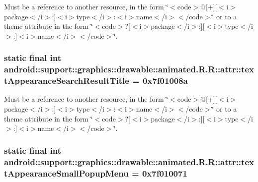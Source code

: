 Must be a reference to another resource, in the form \char`\"{}$<$code$>$@\mbox{[}+\mbox{]}\mbox{[}$<$i$>$package$<$/i$>$:\mbox{]}$<$i$>$type$<$/i$>$:$<$i$>$name$<$/i$>$$<$/code$>$\char`\"{} or to a theme attribute in the form \char`\"{}$<$code$>$?\mbox{[}$<$i$>$package$<$/i$>$:\mbox{]}\mbox{[}$<$i$>$type$<$/i$>$:\mbox{]}$<$i$>$name$<$/i$>$$<$/code$>$\char`\"{}. \hypertarget{classandroid_1_1support_1_1graphics_1_1drawable_1_1animated_1_1_r_1_1attr_c5318dd96096b3475af7db46ec8adacd}{
\subsubsection[{textAppearanceSearchResultTitle}]{\setlength{\rightskip}{0pt plus 5cm}static final int android::support::graphics::drawable::animated.R.R::attr::textAppearanceSearchResultTitle = 0x7f01008a}}
\label{classandroid_1_1support_1_1graphics_1_1drawable_1_1animated_1_1_r_1_1attr_c5318dd96096b3475af7db46ec8adacd}


Must be a reference to another resource, in the form \char`\"{}$<$code$>$@\mbox{[}+\mbox{]}\mbox{[}$<$i$>$package$<$/i$>$:\mbox{]}$<$i$>$type$<$/i$>$:$<$i$>$name$<$/i$>$$<$/code$>$\char`\"{} or to a theme attribute in the form \char`\"{}$<$code$>$?\mbox{[}$<$i$>$package$<$/i$>$:\mbox{]}\mbox{[}$<$i$>$type$<$/i$>$:\mbox{]}$<$i$>$name$<$/i$>$$<$/code$>$\char`\"{}. \hypertarget{classandroid_1_1support_1_1graphics_1_1drawable_1_1animated_1_1_r_1_1attr_8ed7b1945616b7b0df3791cfecd8d68d}{
\subsubsection[{textAppearanceSmallPopupMenu}]{\setlength{\rightskip}{0pt plus 5cm}static final int android::support::graphics::drawable::animated.R.R::attr::textAppearanceSmallPopupMenu = 0x7f010071}}
\label{classandroid_1_1support_1_1graphics_1_1drawable_1_1animated_1_1_r_1_1attr_8ed7b1945616b7b0df3791cfecd8d68d}



